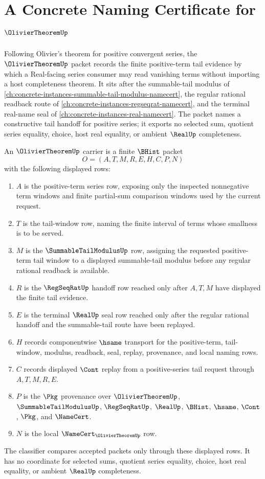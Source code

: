 \chapter{A Concrete Naming Certificate for $\OlivierTheoremUp$}
\label{ch:concrete-instances-olivier-theorem-namecert}

Following Olivier's theorem for positive convergent series, the $\OlivierTheoremUp$ packet records the finite positive-term tail evidence by which a Real-facing series consumer may read vanishing terms without importing a host completeness theorem. It sits after the summable-tail modulus of \autoref{ch:concrete-instances-summable-tail-modulus-namecert}, the regular rational readback route of \autoref{ch:concrete-instances-regseqrat-namecert}, and the terminal real-name seal of \autoref{ch:concrete-instances-real-namecert}. The packet names a constructive tail handoff for positive series; it exports no selected sum, quotient series equality, choice, host real equality, or ambient $\RealUp$ completeness.

\begin{definition}
\label{def:olivier-theorem-carrier}
An $\OlivierTheoremUp$ carrier is a finite $\BHist$ packet
$$
O=(A,T,M,R,E,H,C,P,N)
$$
with the following displayed rows:
\begin{enumerate}
\item $A$ is the positive-term series row, exposing only the inspected nonnegative term windows and finite partial-sum comparison windows used by the current request.
\item $T$ is the tail-window row, naming the finite interval of terms whose smallness is to be served.
\item $M$ is the $\SummableTailModulusUp$ row, assigning the requested positive-term tail window to a displayed summable-tail modulus before any regular rational readback is available.
\item $R$ is the $\RegSeqRatUp$ handoff row reached only after $A,T,M$ have displayed the finite tail evidence.
\item $E$ is the terminal $\RealUp$ seal row reached only after the regular rational handoff and the summable-tail route have been replayed.
\item $H$ records componentwise $\hsame$ transport for the positive-term, tail-window, modulus, readback, seal, replay, provenance, and local naming rows.
\item $C$ records displayed $\Cont$ replay from a positive-series tail request through $A,T,M,R,E$.
\item $P$ is the $\Pkg$ provenance over $\OlivierTheoremUp$, $\SummableTailModulusUp$, $\RegSeqRatUp$, $\RealUp$, $\BHist$, $\hsame$, $\Cont$, $\Pkg$, and $\NameCert$.
\item $N$ is the local $\NameCert_{\OlivierTheoremUp}$ row.
\end{enumerate}
The classifier compares accepted packets only through these displayed rows. It has no coordinate for selected sums, quotient series equality, choice, host real equality, or ambient $\RealUp$ completeness.
\end{definition}

